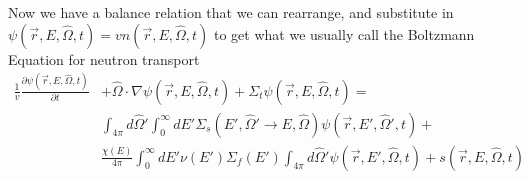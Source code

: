 \documentclass[12pt]{article}
\newcommand{\vOmega}{\ensuremath{\hat{\Omega}}}
\begin{document}
Now we have a balance relation that we can rearrange, and substitute in $\psi(\vec{r}, E, \vOmega, t) = vn(\vec{r}, E, \vOmega, t)$ to get what we usually call the Boltzmann Equation for neutron transport
%
\begin{align}
\frac{1}{v}\frac{\partial \psi(\vec{r}, E, \vOmega, t)}{\partial t} &+ 
\vOmega \cdot \nabla \psi(\vec{r}, E, \vOmega, t) +
\Sigma_t \psi(\vec{r}, E, \vOmega, t) = \nonumber\\
%
& \int_{4\pi} d\vOmega' \int_0^{\infty} dE' \Sigma_s(E', \vOmega' \rightarrow E, \vOmega) \psi(\vec{r}, E', \vOmega', t)  +\nonumber\\
%
& \frac{\chi(E)}{4\pi} \int_0^{\infty} dE' \nu(E') \Sigma_f(E') \int_{4\pi} d\vOmega' \psi(\vec{r}, E', \vOmega, t) +
s(\vec{r}, E, \vOmega, t)
\end{align}

\end{document}
